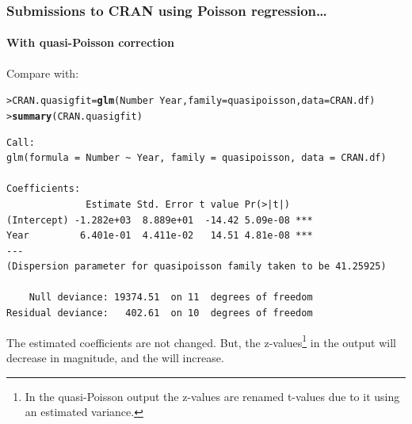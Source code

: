 \documentclass{beamer}\usepackage[]{graphicx}\usepackage[]{xcolor}
\makeatletter
\newcommand{\hlopt}[1]{\textcolor[rgb]{0,0,0}{#1}}%
\newcommand{\hlstd}[1]{\textcolor[rgb]{0.345,0.345,0.345}{#1}}%
\newcommand{\hlkwb}[1]{\textcolor[rgb]{0.69,0.353,0.396}{#1}}%
\newcommand{\hlkwc}[1]{\textcolor[rgb]{0.333,0.667,0.333}{#1}}%
\newcommand{\hlkwd}[1]{\textcolor[rgb]{0.737,0.353,0.396}{\textbf{#1}}}%
\newenvironment{kframe}{%
 \def\at@end@of@kframe{}%
 \ifinner\ifhmode%
  \def\at@end@of@kframe{\end{minipage}}%
  \begin{minipage}{\columnwidth}%
 \fi\fi%
 \def\FrameCommand##1{\hskip\@totalleftmargin \hskip-\fboxsep
 \colorbox{shadecolor}{##1}\hskip-\fboxsep
     \hskip-\linewidth \hskip-\@totalleftmargin \hskip\columnwidth}%
 \MakeFramed {\advance\hsize-\width
   \@totalleftmargin\z@ \linewidth\hsize
   \@setminipage}}%
 {\par\unskip\endMakeFramed%
 \at@end@of@kframe}
\newenvironment{knitrout}{}{} %
\makeatother
\begin{document}
\begin{frame}[fragile]
\frametitle{Submissions to CRAN using Poisson regression\ldots}
\framesubtitle{With quasi-Poisson correction}
Compare with:

\begin{knitrout}\scriptsize
{}\color{fgcolor}\begin{kframe}
\begin{alltt}
\hlstd{> }\hlstd{CRAN.quasigfit} \hlkwb{=} \hlkwd{glm}\hlstd{(Number} \hlopt{~} \hlstd{Year,} \hlkwc{family} \hlstd{= quasipoisson,} \hlkwc{data} \hlstd{= CRAN.df)}
\hlstd{> }\hlkwd{summary}\hlstd{(CRAN.quasigfit)}
\end{alltt}
\end{kframe}
\end{knitrout}

\begin{knitrout}\scriptsize
{}\color{fgcolor}\begin{kframe}
\begin{verbatim}
Call:
glm(formula = Number ~ Year, family = quasipoisson, data = CRAN.df)

Coefficients:
              Estimate Std. Error t value Pr(>|t|)    
(Intercept) -1.282e+03  8.889e+01  -14.42 5.09e-08 ***
Year         6.401e-01  4.411e-02   14.51 4.81e-08 ***
---
(Dispersion parameter for quasipoisson family taken to be 41.25925)

    Null deviance: 19374.51  on 11  degrees of freedom
Residual deviance:   402.61  on 10  degrees of freedom
\end{verbatim}
\end{kframe}
\end{knitrout}

The estimated coefficients are not changed. But, the z-values\footnote{In the quasi-Poisson output the z-values are renamed t-values due to it using an estimated variance.} in the  output will decrease in magnitude, and the \pval{} will increase.

\end{frame}
\end{document}
